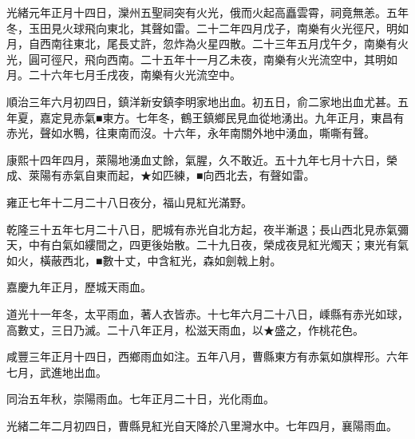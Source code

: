 \begin{pinyinscope}
光緒元年正月十四日，灤州五聖祠突有火光，俄而火起高矗雲霄，祠竟無恙。五年冬，玉田見火球飛向東北，其聲如雷。二十二年四月戊子，南樂有火光徑尺，明如月，自西南往東北，尾長丈許，忽炸為火星四散。二十三年五月戊午夕，南樂有火光，圓可徑尺，飛向西南。二十五年十一月乙未夜，南樂有火光流空中，其明如月。二十六年七月壬戌夜，南樂有火光流空中。

順治三年六月初四日，鎮洋新安鎮李明家地出血。初五日，俞二家地出血尤甚。五年夏，嘉定見赤氣■東方。七年冬，鶴王鎮鄉民見血從地湧出。九年正月，東昌有赤光，聲如水鴨，往東南而沒。十六年，永年南關外地中湧血，嘶嘶有聲。

康熙十四年四月，萊陽地湧血丈餘，氣腥，久不敢近。五十九年七月十六日，榮成、萊陽有赤氣自東而起，★如匹練，■向西北去，有聲如雷。

雍正七年十二月二十八日夜分，福山見紅光滿野。

乾隆三十五年七月二十八日，肥城有赤光自北方起，夜半漸退；長山西北見赤氣彌天，中有白氣如縷間之，四更後始散。二十九日夜，榮成夜見紅光燭天；東光有氣如火，橫蔽西北，■數十丈，中含紅光，森如劍戟上射。

嘉慶九年正月，歷城天雨血。

道光十一年冬，太平雨血，著人衣皆赤。十七年六月二十八日，嵊縣有赤光如球，高數丈，三日乃滅。二十八年正月，松滋天雨血，以★盛之，作桃花色。

咸豐三年正月十四日，西鄉雨血如注。五年八月，曹縣東方有赤氣如旗桿形。六年七月，武進地出血。

同治五年秋，崇陽雨血。七年正月二十日，光化雨血。

光緒二年二月初四日，曹縣見紅光自天降於八里灣水中。七年四月，襄陽雨血。


\end{pinyinscope}